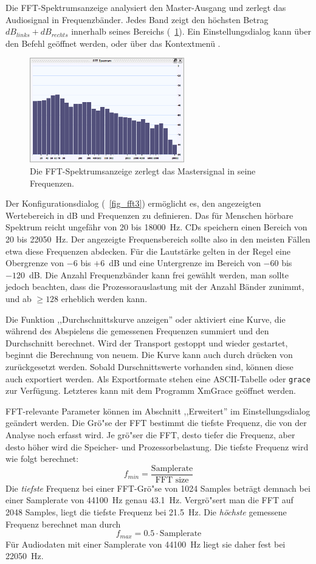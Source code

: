Die FFT-Spektrumsanzeige analysiert den Master-Ausgang und zerlegt das Audiosignal in Frequenzbänder. Jedes Band zeigt den höchsten Betrag $dB_{links} + dB_{rechts}$ innerhalb seines Bereichs (\FigB\ \ref{fig_fft1}). Ein Einstellungsdialog kann über den Befehl  geöffnet werden, oder über das Kontextmenü .

\begin{figure}
	\centering
	\includegraphics[width=0.6\textwidth]{images/fft1}
	\caption{Die FFT-Spektrumsanzeige zerlegt das Mastersignal in seine Frequenzen.}
	\label{fig_fft1}
\end{figure}

Der Konfigurationsdialog (\FigB\ \ref{fig_fft3}) ermöglicht es, den angezeigten Wertebereich in dB und Frequenzen zu definieren. Das für Menschen hörbare Spektrum reicht ungefähr von 20 bis 18000~Hz. CDs speichern einen Bereich von 20 bis 22050~Hz. Der angezeigte Frequensbereich sollte also in den meisten Fällen etwa diese Frequenzen abdecken. Für die Lautstärke gelten in der Regel eine Obergrenze von $-6$ bis $+6$~dB und eine Untergrenze im Bereich von $-60$ bis $-120$~dB. Die Anzahl Frequenzbänder kann frei gewählt werden, man sollte jedoch beachten, dass die Prozessorauslastung mit der Anzahl Bänder zunimmt, und ab $\geq 128$ erheblich werden kann.

Die Funktion ,,Durchschnittskurve anzeigen'' oder  aktiviert eine Kurve, die während des Abspielens die gemessenen Frequenzen summiert und den Durchschnitt berechnet. Wird der Transport gestoppt und wieder gestartet, beginnt die Berechnung von neuem. Die Kurve kann auch durch drücken von  zurückgesetzt werden. Sobald Durschnittswerte vorhanden sind, können diese auch exportiert werden. Als Exportformate stehen eine ASCII-Tabelle oder \texttt{grace} zur Verfügung. Letzteres kann mit dem Programm XmGrace geöffnet werden.

FFT-relevante Parameter können im Abschnitt ,,Erweitert'' im Einstellungsdialog geändert werden. Die Grö"se der FFT bestimmt die tiefste Frequenz, die von der Analyse noch erfasst wird. Je grö"ser die FFT, desto tiefer die Frequenz, aber desto höher wird die Speicher- und Prozessorbelastung. Die tiefste Frequenz wird wie folgt berechnet:
\[
f_{min} = \frac{\textrm{Samplerate}}{\textrm{FFT size}}
\]
Die \emph{tiefste} Frequenz bei einer FFT-Grö"se von 1024 Samples beträgt demnach bei einer Samplerate von 44100~Hz genau 43.1~Hz. Vergrö"sert man die FFT auf 2048 Samples, liegt die tiefste Frequenz bei 21.5~Hz. Die \emph{höchste} gemessene Frequenz berechnet man durch
\[
f_{max} = 0.5 \cdot \textrm{Samplerate}
\]
Für Audiodaten mit einer Samplerate von 44100~Hz liegt sie daher fest bei 22050~Hz.


